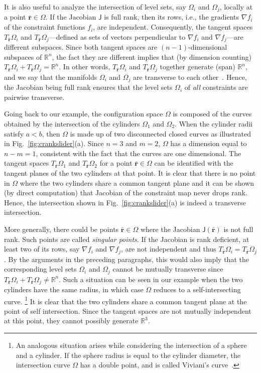 It is also useful to analyze the intersection of level sets, say $\Omega_i$ and $\Omega_j$, locally at a point $\bar{\bm{r}} \in \Omega$.
If the Jacobian $\mathsf{J}$ is full rank, then its rows, i.e., the gradients $\nabla f_i$ of the constraint functions $f_i$, are independent.
Consequently, the tangent spaces $T_{\bar{\bm{r}}}{\Omega_i}$ and $T_{\bar{\bm{r}}}{\Omega_j}$---defined as sets of vectors perpendicular to $\nabla f_i$ and $\nabla f_j$---are different subspaces.
Since both tangent spaces are $(n-1)$-dimensional subspaces of $\mathbb{R}^n$, the fact they are different implies that (by dimension counting) $T_{\bar{\bm{r}}}{\Omega_i} + T_{\bar{\bm{r}}}{\Omega_j} = \mathbb{R}^n$.
In other words, $T_{\bar{\bm{r}}}{\Omega_i}$ and $T_{\bar{\bm{r}}}{\Omega_j}$ together generate (span) $\mathbb{R}^n$, and we say that the manifolds $\Omega_i$ and $\Omega_j$ are transverse to each other~\cite{guillemin1974}.
Hence, the Jacobian being full rank ensures that the level sets $\Omega_i$ of \emph{all} constraints are pairwise transverse.

Going back to our example, the configuration space $\Omega$ is composed of the curves obtained by the intersection of the cylinders $\Omega_1$ and $\Omega_2$.
When the cylinder radii satisfy $a < b$, then $\Omega$ is made up of two disconnected closed curves as illustrated in Fig.~\ref{fig:crankslider}(a).
Since $n = 3$ and $m=2$, $\Omega$ has a dimension equal to $n-m=1$, consistent with the fact that the curves are one dimensional.
The tangent spaces $T_{\bar{\bm{r}}}\Omega_1$ and $T_{\bar{\bm{r}}}\Omega_2$ for a point $\bar{\bm{r}} \in \Omega$ can be identified with the tangent planes of the two cylinders at that point.
It is clear that there is no point in $\Omega$ where the two cylinders share a common tangent plane and it can be shown (by direct computation) that Jacobian of the constraint map never drops rank.
Hence, the intersection shown in Fig.~\ref{fig:crankslider}(a) is indeed a transverse intersection.

More generally, there could be points $\bar{\bm{r}} \in \Omega$ where the Jacobian $\mathsf{J}(\bar{\bm{r}})$ is not full rank.
Such points are called \emph{singular points}.
If the Jacobian is rank deficient, at least two of its rows, say $\nabla f_i$ and $\nabla f_j$, are not independent and thus $T_{\bar{\bm{r}}}\Omega_i = T_{\bar{\bm{r}}}\Omega_j$.
By the arguments in the preceding paragraphs, this would also imply that the corresponding level sets $\Omega_i$ and $\Omega_j$ cannot be mutually transverse since $T_{\bar{\bm{r}}}\Omega_i + T_{\bar{\bm{r}}}\Omega_j \neq \mathbb{R}^n$.
Such a situation can be seen in our example when the two cylinders have the same radius, in which case $\Omega$ reduces to a self-intersecting curve.%
\footnote{An analogous situation arises while considering the intersection of a sphere and a cylinder.
If the sphere radius is equal to the cylinder diameter, the intersection curve $\Omega$ has a double point, and is called Viviani's curve~\cite{struik1988}.}
It is clear that the two cylinders share a common tangent plane at the point of self intersection.
Since the tangent spaces are not mutually independent at this point, they cannot possibly generate $\mathbb{R}^3$.

